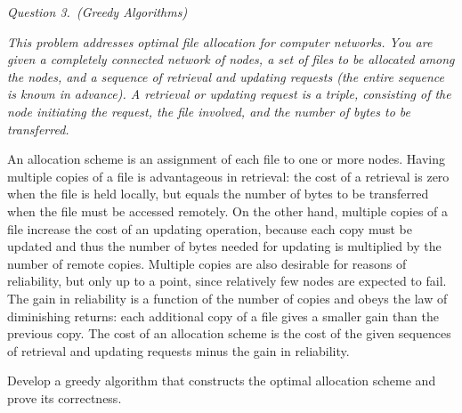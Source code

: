 \documentclass[11pt]{article}
\begin{document}
\bigskip\rm\noindent
\emph{Question 3.~(Greedy Algorithms)}\\
{\footnotesize\it This problem addresses optimal file allocation for computer networks.  You are
given a completely connected network of nodes, a set of files to be allocated
among the nodes, and a sequence of retrieval and updating requests (the entire
sequence is known in advance).  A retrieval or updating request is a triple,
consisting of the node initiating the request, the file involved, and the
number of bytes to be transferred.
  
An allocation scheme is an assignment of each file to one or more nodes.
Having multiple copies of a file is advantageous in retrieval: the cost of a
retrieval is zero when the file is held locally, but equals the number of bytes
to be transferred when the file must be accessed remotely.  On the other hand,
multiple copies of a file increase the cost of an updating operation, because
each copy must be updated and thus the number of bytes needed for updating is
multiplied by the number of remote copies.  Multiple copies are also desirable
for reasons of reliability, but only up to a point, since relatively few nodes
are expected to fail.  The gain in reliability is a function of the number of
copies and obeys the law of diminishing returns: each additional copy of a file
gives a smaller gain than the previous copy.  The cost of an allocation scheme
is the cost of the given sequences of retrieval and updating requests minus the
gain in reliability.

Develop a greedy algorithm that constructs the optimal allocation scheme
and prove its correctness.}
\end{document}
